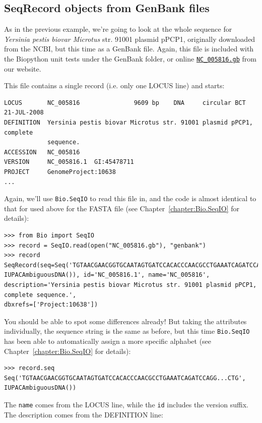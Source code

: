 \documentclass{report}
\begin{document}
\subsection{SeqRecord objects from GenBank files}

As in the previous example, we're going to look at the whole sequence for \textit{Yersinia pestis biovar Microtus} str. 91001 plasmid pPCP1, originally downloaded from the NCBI, but this time as a GenBank file.
Again, this file is included with the Biopython unit tests under the GenBank folder, or online \href{http://biopython.org/SRC/biopython/Tests/GenBank/NC_005816.gb}{\texttt{NC\_005816.gb}} from our website.

This file contains a single record (i.e. only one LOCUS line) and starts:
\begin{verbatim}
LOCUS       NC_005816               9609 bp    DNA     circular BCT 21-JUL-2008
DEFINITION  Yersinia pestis biovar Microtus str. 91001 plasmid pPCP1, complete
            sequence.
ACCESSION   NC_005816
VERSION     NC_005816.1  GI:45478711
PROJECT     GenomeProject:10638
...
\end{verbatim}

Again, we'll use \verb|Bio.SeqIO| to read this file in, and the code is almost identical to that for used above for the FASTA file (see Chapter~\ref{chapter:Bio.SeqIO} for details):

\begin{verbatim}
>>> from Bio import SeqIO
>>> record = SeqIO.read(open("NC_005816.gb"), "genbank")
>>> record
SeqRecord(seq=Seq('TGTAACGAACGGTGCAATAGTGATCCACACCCAACGCCTGAAATCAGATCCAGG...CTG',
IUPACAmbiguousDNA()), id='NC_005816.1', name='NC_005816',
description='Yersinia pestis biovar Microtus str. 91001 plasmid pPCP1, complete sequence.',
dbxrefs=['Project:10638'])
\end{verbatim}

You should be able to spot some differences already! But taking the attributes individually,
the sequence string is the same as before, but this time \verb|Bio.SeqIO| has been able to automatically assign a more specific alphabet (see Chapter~\ref{chapter:Bio.SeqIO} for details):

\begin{verbatim}
>>> record.seq
Seq('TGTAACGAACGGTGCAATAGTGATCCACACCCAACGCCTGAAATCAGATCCAGG...CTG', IUPACAmbiguousDNA())
\end{verbatim}

The \verb|name| comes from the LOCUS line, while the \verb|id| includes the version suffix.
The description comes from the DEFINITION line:
\end{document}

